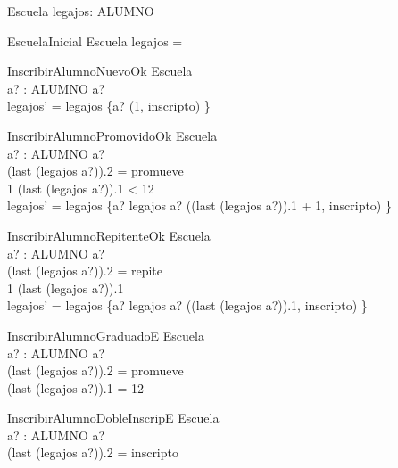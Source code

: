 \documentclass{article}
\begin{document}
  \begin{schema}{Escuela}
    legajos: ALUMNO \pfun {}
  \end{schema}

  \begin{schema}{EscuelaInicial}
    Escuela
    \where
    legajos = \emptyset
  \end{schema}

  \begin{schema}{InscribirAlumnoNuevoOk}
    \Delta Escuela \\
    a? : ALUMNO
    \where
    a? \notin {} \\
    legajos' = legajos \cup \{a? \mapsto \langle (1, inscripto) \rangle\}
  \end{schema}

  \begin{schema}{InscribirAlumnoPromovidoOk}
    \Delta Escuela \\
    a? : ALUMNO
    \where
    a? \in {} \\
    (last \; (legajos \; a?)).2 = promueve \\
    1 \leq (last \; (legajos \; a?)).1 < 12 \\ 
    legajos' = legajos \oplus \{a? \mapsto legajos \; a? \cat \langle ((last \; (legajos \; a?)).1 + 1, inscripto) \rangle\}
  \end{schema}

  \begin{schema}{InscribirAlumnoRepitenteOk}
    \Delta Escuela \\
    a? : ALUMNO
    \where
    a? \in {} \\
    (last \; (legajos \; a?)).2 = repite \\
    1 \leq (last \; (legajos \; a?)).1  \\ 
    legajos' = legajos \oplus \{a? \mapsto legajos \; a? \cat \langle ((last \; (legajos \; a?)).1, inscripto) \rangle\}
  \end{schema}

  \begin{schema}{InscribirAlumnoGraduadoE}
    \Xi Escuela \\
    a? : ALUMNO
    \where
    a? \in {} \\
    (last \; (legajos \; a?)).2 = promueve \\
    (last \; (legajos \; a?)).1 = 12
  \end{schema}

  \begin{schema}{InscribirAlumnoDobleInscripE}
    \Xi Escuela \\
    a? : ALUMNO
    \where
    a? \in {} \\
    (last \; (legajos \; a?)).2 = inscripto
  \end{schema}
\end{document}
